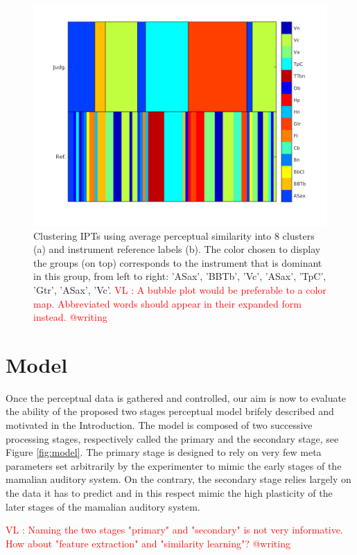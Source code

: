 \documentclass{article}
\newcommand{\ipts}{IPTs\xspace}
\newcommand{\vl}[1]{\textcolor{red}{VL : #1}}
\begin{document}
\begin{figure}
\center
\includegraphics[width = \textwidth]{figures/groupInstruments.png}
\caption{Clustering \ipts using average perceptual similarity into 8 clusters (a) and instrument reference labels (b). The color chosen to display the groups (on top) corresponds  to the instrument that is dominant in this group, from left to right: 'ASax', 'BBTb', 'Vc', 'ASax', 'TpC', 'Gtr', 'ASax', 'Vc'.
\vl{A bubble plot would be preferable to a color map. Abbreviated words should appear in their expanded form instead. @writing}}
\label{fig:gi}
\end{figure}

\section{Model}\label{sec:model}

Once the perceptual data is gathered and controlled, our aim is now to evaluate the ability of the proposed two stages perceptual model brifely described and motivated in the Introduction. The model is composed of two successive processing stages, respectively called the primary and the secondary stage, see Figure \ref{fig:model}. The primary stage is designed to rely on very few meta parameters set arbitrarily by the experimenter to mimic the early stages of the mamalian auditory system. On the contrary, the secondary stage relies largely on the data it has to predict and in this respect mimic the high plasticity of the later stages of the mamalian auditory system.

\vl{Naming the two stages "primary" and "secondary" is not very informative.
How about "feature extraction" and "similarity learning"? @writing}
\end{document}

